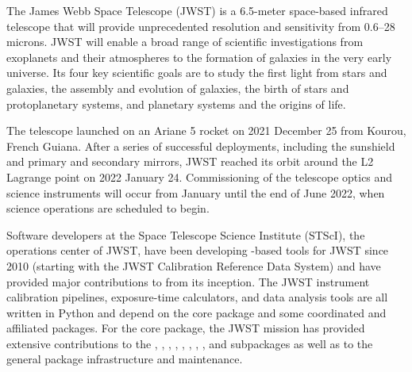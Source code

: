 \documentclass[modern]{aastex631}
\begin{document}
The James Webb Space Telescope (JWST) is a 6.5-meter space-based
infrared telescope that will provide unprecedented resolution and
sensitivity from 0.6--28 microns. JWST will enable a broad range
of scientific investigations from exoplanets and their atmospheres
to the formation of galaxies in the very early universe. Its four
key scientific goals are to study the first light from stars and
galaxies, the assembly and evolution of galaxies, the birth of stars and
protoplanetary systems, and planetary systems and the origins of life.

The telescope launched on an Ariane 5 rocket on 2021 December 25 from
Kourou, French Guiana. After a series of successful deployments,
including the sunshield and primary and secondary mirrors, JWST reached
its orbit around the L2 Lagrange point on 2022 January 24. Commissioning
of the telescope optics and science instruments will occur from January
until the end of June 2022, when science operations are scheduled to
begin.

Software developers at the Space Telescope Science Institute (STScI),
the operations center of JWST, have been developing \python-based tools
for JWST since 2010 (starting with the JWST Calibration Reference Data
System) and have provided major contributions to \astropy from its
inception. The JWST instrument calibration pipelines, exposure-time
calculators, and data analysis tools are all written in Python and
depend on the \astropypkg core package and some coordinated and
affiliated packages. For the \astropypkg core package, the JWST mission
has provided extensive contributions to the ,
, , ,
, ,
, , and
 subpackages as well as to the general
package infrastructure and maintenance.
\end{document}
